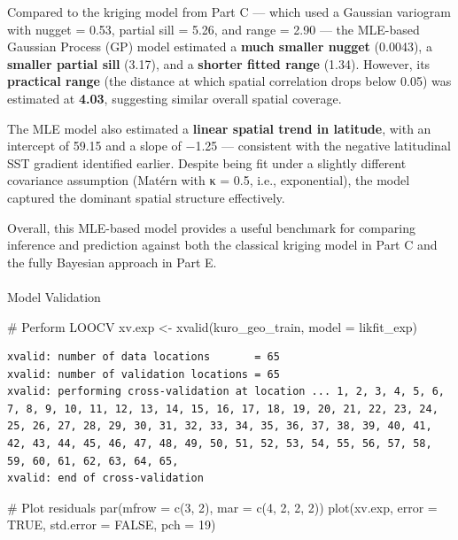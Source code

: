 \documentclass[
  11pt,
]{article}
\makeatletter
\let\oldparagraph\paragraph
\renewcommand{\paragraph}{
    \@ifstar
      \xxxParagraphStar
      \xxxParagraphNoStar
  }
\newcommand{\xxxParagraphStar}[1]{\oldparagraph*{#1}\mbox{}}
\newcommand{\xxxParagraphNoStar}[1]{\oldparagraph{#1}\mbox{}}
\newenvironment{Shaded}{\begin{snugshade}}{\end{snugshade}}
\newcommand{\AttributeTok}[1]{\textcolor[rgb]{0.40,0.45,0.13}{#1}}
\newcommand{\CommentTok}[1]{\textcolor[rgb]{0.37,0.37,0.37}{#1}}
\newcommand{\ConstantTok}[1]{\textcolor[rgb]{0.56,0.35,0.01}{#1}}
\newcommand{\DecValTok}[1]{\textcolor[rgb]{0.68,0.00,0.00}{#1}}
\newcommand{\FunctionTok}[1]{\textcolor[rgb]{0.28,0.35,0.67}{#1}}
\newcommand{\NormalTok}[1]{\textcolor[rgb]{0.00,0.23,0.31}{#1}}
\newcommand{\OtherTok}[1]{\textcolor[rgb]{0.00,0.23,0.31}{#1}}
\makeatother
\begin{document}
Compared to the kriging model from Part C --- which used a Gaussian
variogram with nugget = 0.53, partial sill = 5.26, and range = 2.90 ---
the MLE-based Gaussian Process (GP) model estimated a \textbf{much
smaller nugget} (0.0043), a \textbf{smaller partial sill} (3.17), and a
\textbf{shorter fitted range} (1.34). However, its \textbf{practical
range} (the distance at which spatial correlation drops below 0.05) was
estimated at \textbf{4.03}, suggesting similar overall spatial coverage.

The MLE model also estimated a \textbf{linear spatial trend in
latitude}, with an intercept of 59.15 and a slope of −1.25 ---
consistent with the negative latitudinal SST gradient identified
earlier. Despite being fit under a slightly different covariance
assumption (Matérn with κ = 0.5, i.e., exponential), the model captured
the dominant spatial structure effectively.

Overall, this MLE-based model provides a useful benchmark for comparing
inference and prediction against both the classical kriging model in
Part C and the fully Bayesian approach in Part E.

\paragraph{Model Validation}\label{model-validation}

\begin{Shaded}
\begin{Highlighting}[]
\CommentTok{\# Perform LOOCV}
\NormalTok{xv.exp }\OtherTok{\textless{}{-}} \FunctionTok{xvalid}\NormalTok{(kuro\_geo\_train, }\AttributeTok{model =}\NormalTok{ likfit\_exp)}
\end{Highlighting}
\end{Shaded}

\begin{verbatim}
xvalid: number of data locations       = 65
xvalid: number of validation locations = 65
xvalid: performing cross-validation at location ... 1, 2, 3, 4, 5, 6, 7, 8, 9, 10, 11, 12, 13, 14, 15, 16, 17, 18, 19, 20, 21, 22, 23, 24, 25, 26, 27, 28, 29, 30, 31, 32, 33, 34, 35, 36, 37, 38, 39, 40, 41, 42, 43, 44, 45, 46, 47, 48, 49, 50, 51, 52, 53, 54, 55, 56, 57, 58, 59, 60, 61, 62, 63, 64, 65, 
xvalid: end of cross-validation
\end{verbatim}

\begin{Shaded}
\begin{Highlighting}[]
\CommentTok{\# Plot residuals}
\FunctionTok{par}\NormalTok{(}\AttributeTok{mfrow =} \FunctionTok{c}\NormalTok{(}\DecValTok{3}\NormalTok{, }\DecValTok{2}\NormalTok{), }\AttributeTok{mar =} \FunctionTok{c}\NormalTok{(}\DecValTok{4}\NormalTok{, }\DecValTok{2}\NormalTok{, }\DecValTok{2}\NormalTok{, }\DecValTok{2}\NormalTok{))}
\FunctionTok{plot}\NormalTok{(xv.exp, }\AttributeTok{error =} \ConstantTok{TRUE}\NormalTok{, }\AttributeTok{std.error =} \ConstantTok{FALSE}\NormalTok{, }\AttributeTok{pch =} \DecValTok{19}\NormalTok{)}
\end{Highlighting}
\end{Shaded}
\end{document}
